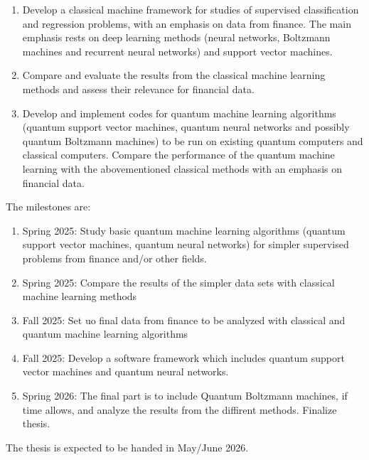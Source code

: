 \documentclass[%
oneside,                 %
final,                   %
10pt]{article}
\begin{document}
\begin{enumerate}
\item Develop a classical machine framework for studies of supervised classification and regression problems, with an emphasis on data from finance. The main emphasis rests on deep learning methods (neural networks, Boltzmann machines and recurrent neural networks) and support vector machines.

\item Compare and evaluate the results from the classical machine learning methods and assess their relevance for financial data.

\item Develop and implement  codes for quantum machine learning algorithms (quantum support vector machines, quantum neural networks and possibly quantum Boltzmann machines) to be run on existing quantum computers and classical computers. Compare the performance of the quantum machine learning  with the abovementioned classical methods with an emphasis on  financial data.
\end{enumerate}

\noindent
The milestones are:
\begin{enumerate}
\item Spring 2025: Study basic quantum machine learning algorithms (quantum support vector machines, quantum neural networks) for simpler supervised problems from finance and/or other fields.

\item Spring 2025: Compare the results of the simpler data sets with classical machine learning methods

\item Fall 2025: Set uo final data from finance to be analyzed with classical and quantum machine learning algorithms

\item Fall 2025: Develop a software framework which includes quantum support vector machines and quantum neural networks.

\item Spring 2026: The final part is to include Quantum Boltzmann machines, if time allows,  and analyze the results from the diffirent methods. Finalize thesis. 
\end{enumerate}

\noindent
The thesis is expected to be handed in May/June 2026.
\end{document}
